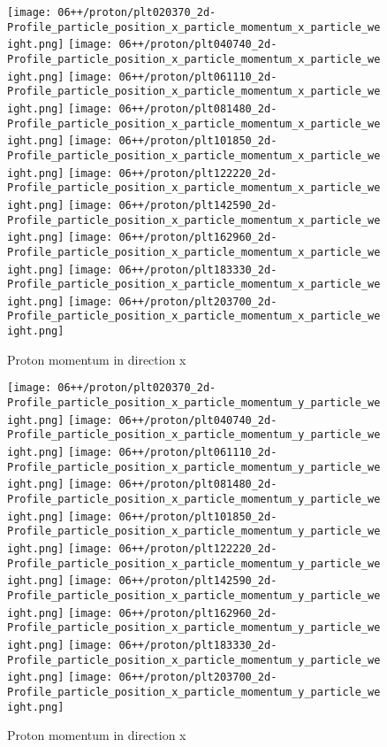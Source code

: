 \begin{figure}
  \centering
  {\texttt{[image: 06++/proton/plt020370\_2d-Profile\_particle\_position\_x\_particle\_momentum\_x\_particle\_weight.png]}}
  {\texttt{[image: 06++/proton/plt040740\_2d-Profile\_particle\_position\_x\_particle\_momentum\_x\_particle\_weight.png]}}
  {\texttt{[image: 06++/proton/plt061110\_2d-Profile\_particle\_position\_x\_particle\_momentum\_x\_particle\_weight.png]}}
  {\texttt{[image: 06++/proton/plt081480\_2d-Profile\_particle\_position\_x\_particle\_momentum\_x\_particle\_weight.png]}}
  {\texttt{[image: 06++/proton/plt101850\_2d-Profile\_particle\_position\_x\_particle\_momentum\_x\_particle\_weight.png]}}
  {\texttt{[image: 06++/proton/plt122220\_2d-Profile\_particle\_position\_x\_particle\_momentum\_x\_particle\_weight.png]}}
  {\texttt{[image: 06++/proton/plt142590\_2d-Profile\_particle\_position\_x\_particle\_momentum\_x\_particle\_weight.png]}}
  {\texttt{[image: 06++/proton/plt162960\_2d-Profile\_particle\_position\_x\_particle\_momentum\_x\_particle\_weight.png]}}
  {\texttt{[image: 06++/proton/plt183330\_2d-Profile\_particle\_position\_x\_particle\_momentum\_x\_particle\_weight.png]}}
  {\texttt{[image: 06++/proton/plt203700\_2d-Profile\_particle\_position\_x\_particle\_momentum\_x\_particle\_weight.png]}}
  \caption{Proton momentum in direction x}\label{fig:06++_p_vx}
\end{figure}

\begin{figure}
  \centering
  {\texttt{[image: 06++/proton/plt020370\_2d-Profile\_particle\_position\_x\_particle\_momentum\_y\_particle\_weight.png]}}
  {\texttt{[image: 06++/proton/plt040740\_2d-Profile\_particle\_position\_x\_particle\_momentum\_y\_particle\_weight.png]}}
  {\texttt{[image: 06++/proton/plt061110\_2d-Profile\_particle\_position\_x\_particle\_momentum\_y\_particle\_weight.png]}}
  {\texttt{[image: 06++/proton/plt081480\_2d-Profile\_particle\_position\_x\_particle\_momentum\_y\_particle\_weight.png]}}
  {\texttt{[image: 06++/proton/plt101850\_2d-Profile\_particle\_position\_x\_particle\_momentum\_y\_particle\_weight.png]}}
  {\texttt{[image: 06++/proton/plt122220\_2d-Profile\_particle\_position\_x\_particle\_momentum\_y\_particle\_weight.png]}}
  {\texttt{[image: 06++/proton/plt142590\_2d-Profile\_particle\_position\_x\_particle\_momentum\_y\_particle\_weight.png]}}
  {\texttt{[image: 06++/proton/plt162960\_2d-Profile\_particle\_position\_x\_particle\_momentum\_y\_particle\_weight.png]}}
  {\texttt{[image: 06++/proton/plt183330\_2d-Profile\_particle\_position\_x\_particle\_momentum\_y\_particle\_weight.png]}}
  {\texttt{[image: 06++/proton/plt203700\_2d-Profile\_particle\_position\_x\_particle\_momentum\_y\_particle\_weight.png]}}
  \caption{Proton momentum in direction x}\label{fig:06++_p_vy}
\end{figure}

